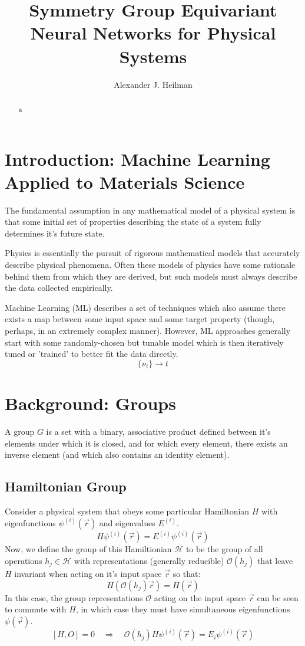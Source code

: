 \documentclass[]{report}
\title{Symmetry Group Equivariant Neural Networks for Physical Systems}
\author{Alexander J. Heilman}
\begin{document}
\maketitle

\begin{abstract}
a
\end{abstract}

\tableofcontents

\chapter{Introduction: Machine Learning Applied to Materials Science}
The fundamental assumption in any mathematical model of a physical system is that some initial set of properties describing the state of a system fully determines it's future state. 

Physics is essentially the pursuit of rigorous mathematical models that accurately describe physical phenomena. Often these models of physics have some rationale behind them from which they are derived, but such models must always describe the data collected empirically.

Machine Learning (ML) describes a set of techniques which also assume there exists a map between some input space and some target property (though, perhaps, in an extremely complex manner). However, ML approaches generally start with some randomly-chosen but tunable model which is then iteratively tuned or 'trained' to better fit the data directly.
\[
\lbrace \nu_i\rbrace \rightarrow t
\]
	
\chapter{Background: Groups}
A group $G$ is a set with a binary, associative product defined between it's elements under which it is closed, and for which every element, there exists an inverse element (and which also contains an identity element).


\section{Hamiltonian Group}
Consider a physical system that obeys some particular Hamiltonian $H$ with eigenfunctions $\psi^{(i)}(\vec{r})$ and eigenvalues $E^{(i)}$.
$$
H\psi^{(i)}(\vec{r})=E^{(i)}\psi^{(i)}(\vec{r})
$$
Now, we define the group of this Hamiltionian $\mathcal{H}$ to be the group of all operations $h_j \in \mathcal{H}$ with representations (generally reducible) $\mathcal{O}(h_j)$ that leave $H$ invariant when acting on it's input space $\vec{r}$ so that:
$$
H(\mathcal{O}(h_j)\vec{r}) = H(\vec{r})
$$
In this case, the group representations $\mathcal{O}$ acting on the input space $\vec{r}$ can be seen to commute with $H$, in which case they must have simultaneous eigenfunctions $\psi(\vec{r})$.
$$
[H,O]=0 \quad \Rightarrow \quad \mathcal{O}(h_j)H\psi^{(i)}(\vec{r}) = E_i\psi^{(i)}(\vec{r})
$$ 
\end{document}
